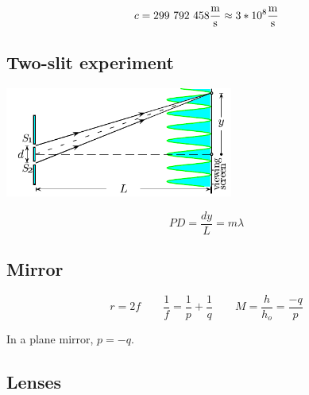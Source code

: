 \[
	c = 299\ 792\ 458 \frac{\meter}{\second} \approx 3 * 10^8 \frac{\meter}{\second}
\]

\subsection{Two-slit experiment}

\includegraphics[width=75mm]{content/soundlight/twoSlit}

\[
	PD = \frac{dy}{L} = m\lambda
\]

\subsection{Mirror}



\[
	r = 2f \qquad
	\frac{1}{f} = \frac{1}{p} + \frac{1}{q} \qquad
	M = \frac{h}{h_o} = \frac{-q}{p}
\]

In a plane mirror, $p = -q$.

\subsection{Lenses}


